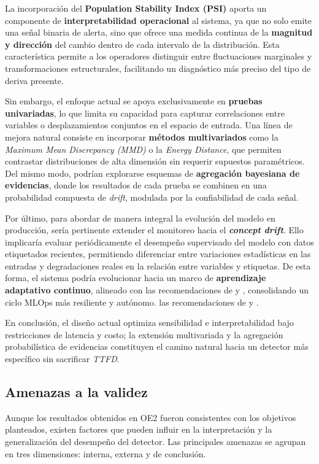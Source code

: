 La incorporación del \textbf{Population Stability Index (PSI)} aporta un componente de \textbf{interpretabilidad operacional} al sistema, ya que no solo emite una señal binaria de alerta, sino que ofrece una medida continua de la \textbf{magnitud y dirección} del cambio dentro de cada intervalo de la distribución.  
Esta característica permite a los operadores distinguir entre fluctuaciones marginales y transformaciones estructurales, facilitando un diagnóstico más preciso del tipo de deriva presente.

Sin embargo, el enfoque actual se apoya exclusivamente en \textbf{pruebas univariadas}, lo que limita su capacidad para capturar correlaciones entre variables o desplazamientos conjuntos en el espacio de entrada.  
Una línea de mejora natural consiste en incorporar \textbf{métodos multivariados} como la \textit{Maximum Mean Discrepancy (MMD)} o la \textit{Energy Distance}, que permiten contrastar distribuciones de alta dimensión sin requerir supuestos paramétricos.  
Del mismo modo, podrían explorarse esquemas de \textbf{agregación bayesiana de evidencias}, donde los resultados de cada prueba se combinen en una probabilidad compuesta de \textit{drift}, modulada por la confiabilidad de cada señal.

Por último, para abordar de manera integral la evolución del modelo en producción, sería pertinente extender el monitoreo hacia el \textbf{\textit{concept drift}}.  
Ello implicaría evaluar periódicamente el desempeño supervisado del modelo con datos etiquetados recientes, permitiendo diferenciar entre variaciones estadísticas en las entradas y degradaciones reales en la relación entre variables y etiquetas.  
De esta forma, el sistema podría evolucionar hacia un marco de \textbf{aprendizaje adaptativo continuo}, alineado con las recomendaciones de \citet{Gama2014} y \citet{Lu2019}, consolidando un ciclo MLOps más resiliente y autónomo.
las recomendaciones de \citet{Gama2014} y \citet{Lu2019}.  

En conclusión, el diseño actual optimiza sensibilidad e interpretabilidad bajo restricciones de latencia y costo; la extensión multivariada y la agregación probabilística de evidencias constituyen el camino natural hacia un detector más específico sin sacrificar \emph{TTFD}.


\subsection{Amenazas a la validez}

Aunque los resultados obtenidos en OE2 fueron consistentes con los objetivos planteados, existen factores que pueden influir en la interpretación y la generalización del desempeño del detector.  
Las principales amenazas se agrupan en tres dimensiones: interna, externa y de conclusión.

